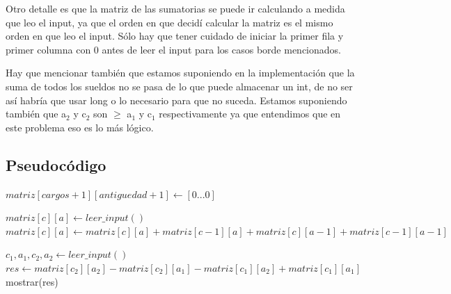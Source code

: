 Otro detalle es que la matriz de las sumatorias se puede ir calculando a medida que leo el input, ya que el orden en que decidí calcular la matriz es el mismo orden en que leo el input. Sólo hay que tener cuidado de iniciar la primer fila y primer columna con 0 antes de leer el input para los casos borde mencionados. \newline

Hay que mencionar también que estamos suponiendo en la implementación que la suma de todos los sueldos no se pasa de lo que puede almacenar un int, de no ser así habría que usar long o lo necesario para que no suceda. Estamos suponiendo también que a$_2$ y c$_2$ son $\geq$ a$_1$ y c$_1$ respectivamente ya que entendimos que en este problema eso es lo más lógico.

\subsection {Pseudocódigo}

\begin{algorithmic}

	\State $matriz[cargos + 1][antiguedad + 1] \gets [0...0]$ 

			\State $matriz[c][a] \gets leer\_input()$
			\State $matriz[c][a] \gets matriz[c][a] + matriz[c - 1][a] + matriz[c][a - 1] + matriz[c - 1][a - 1]$
		\EndFor
	\EndFor

		\State $c_1, a_1, c_2, a_2 \gets leer\_input()$
		\State $res \gets matriz[c_2][a_2] - matriz[c_2][a_1] - matriz[c_1][a_2] + matriz[c_1][a_1]$
		\State mostrar(res)
	\EndFor

\end{algorithmic}
